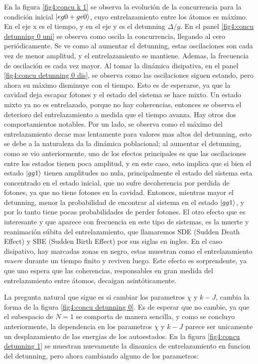 En la figura \ref{fig4:concu k 1} se observa la evolución de la concurrencia para la condición inicial $\ket{eg0+ge0}$, cuyo entrelazamiento entre los átomos es máximo. En el eje x es el tiempo, y en el eje y es el detunning $\Delta/g$. En el panel \ref{fig4:concu detunning 0 uni} se observa como oscila la concurrencia, llegando al cero periódicamente. Se ve como al aumentar el detunning, estas oscilaciones son cada vez de menor amplitud, y el entrelazamiento se mantiene. Ademas, la frecuencia de oscilación es cada vez mayor. Al tomar la dinámica disipativa, en el panel \ref{fig4:concu detunning 0 dis}, se observa como las oscilaciones siguen estando, pero ahora su máximo disminuye con el tiempo. Esto es de esperarse, ya que la cavidad deja escapar fotones y el estado del sistema se hace mixto. Un estado mixto ya no es entrelazado, porque no hay coherencias, entonces se observa el deterioro del entrelazamiento a medida que el tiempo avanza. Hay otros dos comportamientos notables. Por un lado, se observa como el máximo del entrelazamiento decae mas lentamente para valores mas altos del detunning, esto se debe a la naturaleza da la dinámica poblacional; al aumentar el detunning, como se vio anteriormente, uno de los efectos principales es que las oscilaciones entre los estados tienen poca amplitud, y en este caso, esto implica que si bien el estado $\ket{gg1}$ tienen amplitudes no nula, principalmente el estado del sistema esta concentrado en el estado inicial, que no sufre decoherencia por perdida de fotones, ya que no tiene fotones en la cavidad. Entonces, mientras mayor el detunning, menor la probabilidad de encontrar al sistema en el estado $\ket{gg1}$, y por lo tanto tiene pocas probabilidades de perder fotones. El otro efecto que es interesante y que aparece con frecuencia en este tipo de sistemas, es la muerte y reanimación súbita del entrelazamiento, que llamaremos SDE (Sudden Death Effect) y SBE (Sudden Birth Effect) por sus siglas en ingles. En el caso disipativo, hay marcadas zonas en negro, estas muestran como el entrelazamiento \textit{muere} durante un tiempo finito y reviven luego. Este efecto es sorprendente, ya que uno espera que las coherencias, responsables en gran medida del entrelazamiento entre átomos, decaigan asintóticamente. 

La pregunta natural que sigue es si cambiar los parametros $\chi$ y $k-J$, cambia la forma de la figura \ref{fig4:concu detunning 0}. Es de esperar que no cambie, ya que el subespacio de $N=1$ se comporta de manera sencilla, y como se concluyo anteriormente, la dependencia en los parametros $\chi$ y $k-J$ parece ser unicamente un desplazamiento de las energias de los autoestados. En la figura \ref{fig4:concu detunning 1} se muestran nuevamente la dinamica de entrelazamiento en funcion del detunning, pero ahora cambiando alguno de los parametros:


